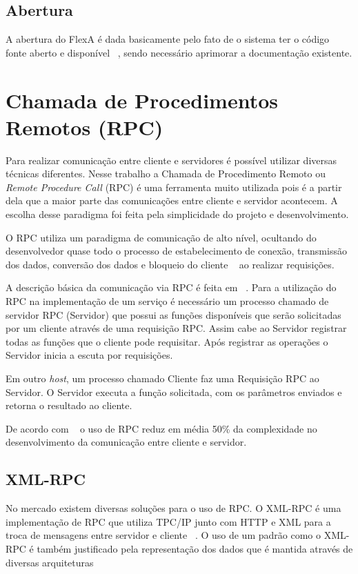     \subsection{Abertura}
    
    A abertura do FlexA é dada basicamente pelo fato de o sistema ter o código fonte aberto e disponível ~\cite{silas}, sendo necessário aprimorar a documentação existente. 


\section{Chamada de Procedimentos Remotos (RPC)}

    Para realizar comunicação entre cliente e servidores é possível utilizar diversas técnicas diferentes. Nesse trabalho a Chamada de Procedimento Remoto ou \textit{Remote Procedure Call} (RPC) é uma ferramenta muito utilizada pois é a partir dela que a maior parte das comunicações entre cliente e servidor acontecem. A escolha desse paradigma foi feita pela simplicidade do projeto e desenvolvimento. 
    
    O RPC utiliza um paradigma de comunicação de alto nível, ocultando do desenvolvedor quase todo o processo de estabelecimento de conexão, transmissão dos dados, conversão dos dados e bloqueio do cliente ~\cite{rpc} ao realizar requisições.
    
    A descrição básica da comunicação via RPC é feita em ~\cite{rpc}. Para a utilização do RPC na implementação de um serviço é necessário um processo chamado de servidor RPC (Servidor) que possui as funções disponíveis que serão solicitadas por um cliente através de uma requisição RPC. Assim cabe ao Servidor registrar todas as funções que o cliente pode requisitar. Após registrar as operações o Servidor inicia a escuta por requisições.
    
    Em outro \textit{host}, um processo chamado Cliente faz uma Requisição RPC ao Servidor. O Servidor executa a função solicitada, com os parâmetros enviados e retorna o resultado ao cliente.
    
    De acordo com ~\cite{rpc} o uso de RPC reduz em média 50\% da complexidade no desenvolvimento da comunicação entre cliente e servidor.
    
    \subsection{XML-RPC}
    
    No mercado existem diversas soluções para o uso de RPC. O XML-RPC é uma implementação de RPC que utiliza TPC/IP junto com HTTP e XML para a troca de mensagens entre servidor e cliente ~\cite{xmlrpc}. O uso de um padrão como o XML-RPC é também justificado pela representação dos dados que é mantida através de diversas arquiteturas ~\cite{xmlrpcMessage}
    
